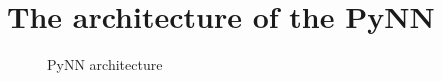 \chapter{The architecture of the PyNN}
\label{appendix:a}
\begin{figure}[htb]
    \centering
    \begin{sideways}
        
    \end{sideways}
    \caption{PyNN architecture}
\end{figure}